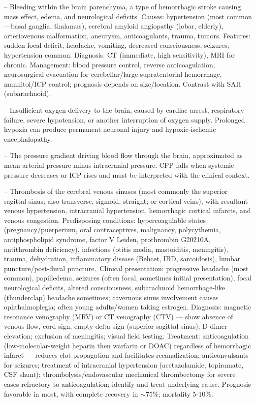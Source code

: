 -- Bleeding within the brain parenchyma, a type of hemorrhagic stroke causing mass effect, edema, and neurological deficits. Causes: hypertension (most common—basal ganglia, thalamus), cerebral amyloid angiopathy (lobar, elderly), arteriovenous malformation, aneurysm, anticoagulants, trauma, tumors. Features: sudden focal deficit, headache, vomiting, decreased consciousness, seizures; hypertension common. Diagnosis: CT (immediate, high sensitivity), MRI for chronic. Management: blood pressure control, reverse anticoagulation, neurosurgical evacuation for cerebellar/large supratentorial hemorrhage, mannitol/ICP control; prognosis depends on size/location. Contrast with SAH (subarachnoid).

-- Insufficient oxygen delivery to the brain, caused by cardiac arrest, respiratory failure, severe hypotension, or another interruption of oxygen supply. Prolonged hypoxia can produce permanent neuronal injury and hypoxic-ischemic encephalopathy.

-- The pressure gradient driving blood flow through the brain, approximated as mean arterial pressure minus intracranial pressure. CPP falls when systemic pressure decreases or ICP rises and must be interpreted with the clinical context.

-- Thrombosis of the cerebral venous sinuses (most commonly the superior sagittal sinus; also transverse, sigmoid, straight; or cortical veins), with resultant venous hypertension, intracranial hypertension, hemorrhagic cortical infarcts, and venous congestion. Predisposing conditions: hypercoagulable states (pregnancy/puerperium, oral contraceptives, malignancy, polycythemia, antiphospholipid syndrome, factor V Leiden, prothrombin G20210A, antithrombin deficiency), infections (otitis media, mastoiditis, meningitis), trauma, dehydration, inflammatory disease (Behcet, IBD, sarcoidosis), lumbar puncture/post-dural puncture.\ Clinical presentation: progressive headache (most common), papilledema, seizures (often focal, sometimes initial presentation), focal neurological deficits, altered consciousness, subarachnoid hemorrhage-like (thunderclap) headache sometimes; cavernous sinus involvement causes ophthalmoplegia; often young adults/women taking estrogen. Diagnosis: magnetic resonance venography (MRV) or CT venography (CTV) — show absence of venous flow, cord sign, empty delta sign (superior sagittal sinus); D-dimer elevation; exclusion of meningitis; visual field testing. Treatment: anticoagulation (low-molecular-weight heparin then warfarin or DOAC) regardless of hemorrhagic infarct — reduces clot propagation and facilitates recanalization; anticonvulsants for seizures; treatment of intracranial hypertension (acetazolamide, topiramate, CSF shunt); thrombolysis/endovascular mechanical thrombectomy for severe cases refractory to anticoagulation; identify and treat underlying cause. Prognosis favorable in most, with complete recovery in $\sim 75\%$; mortality 5-10\%.

